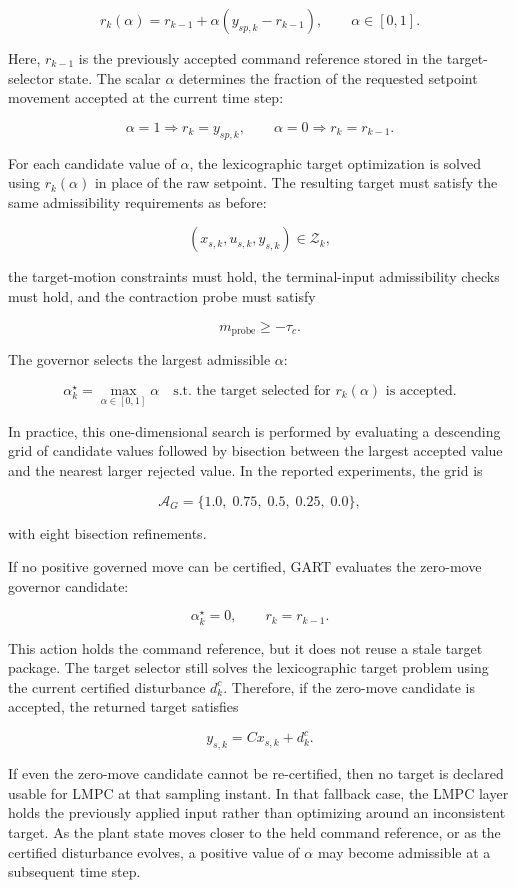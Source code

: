 \documentclass[11pt]{article}
\begin{document}
\[
r_k(\alpha)
=
r_{k-1}
+
\alpha\left(y_{sp,k}-r_{k-1}\right),
\qquad
\alpha\in[0,1].
\]

Here, $r_{k-1}$ is the previously accepted command reference stored in the target-selector state. The scalar $\alpha$ determines the fraction of the requested setpoint movement accepted at the current time step:


\[
\alpha=1 \Rightarrow r_k=y_{sp,k},
\qquad
\alpha=0 \Rightarrow r_k=r_{k-1}.
\]

For each candidate value of $\alpha$, the lexicographic target optimization is solved using $r_k(\alpha)$ in place of the raw setpoint. The resulting target must satisfy the same admissibility requirements as before:


\[
(x_{s,k},u_{s,k},y_{s,k})\in\mathcal Z_k,
\]

the target-motion constraints must hold, the terminal-input admissibility checks must hold, and the contraction probe must satisfy


\[
m_{\mathrm{probe}}\ge -\tau_c.
\]

The governor selects the largest admissible $\alpha$:


\[
\alpha_k^\star
=
\max_{\alpha\in[0,1]}
\alpha
\quad
\text{s.t. the target selected for }r_k(\alpha)
\text{ is accepted}.
\]

In practice, this one-dimensional search is performed by evaluating a descending grid of candidate values followed by bisection between the largest accepted value and the nearest larger rejected value. In the reported experiments, the grid is


\[
\mathcal A_G=\{1.0,\;0.75,\;0.5,\;0.25,\;0.0\},
\]

with eight bisection refinements.


If no positive governed move can be certified, GART evaluates the zero-move governor candidate:


\[
\alpha_k^\star=0,
\qquad
r_k=r_{k-1}.
\]

This action holds the command reference, but it does not reuse a stale target package. The target selector still solves the lexicographic target problem using the current certified disturbance $d^c_k$. Therefore, if the zero-move candidate is accepted, the returned target satisfies


\[
y_{s,k}=Cx_{s,k}+d^c_k.
\]

If even the zero-move candidate cannot be re-certified, then no target is declared usable for LMPC at that sampling instant. In that fallback case, the LMPC layer holds the previously applied input rather than optimizing around an inconsistent target. As the plant state moves closer to the held command reference, or as the certified disturbance evolves, a positive value of $\alpha$ may become admissible at a subsequent time step.
\end{document}
